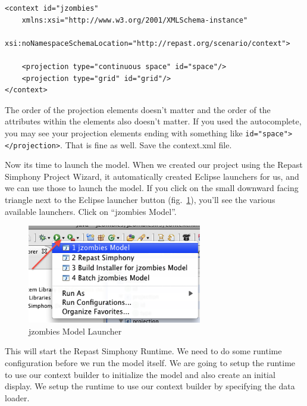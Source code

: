 \documentclass[11pt]{amsart}
\begin{document}
\noindent\begin{minipage}[h]{\textwidth}
\vspace{.2in}
\lstset{language=java,caption=context.xml Complete }
\begin{lstlisting}
<context id="jzombies"
	xmlns:xsi="http://www.w3.org/2001/XMLSchema-instance"
	xsi:noNamespaceSchemaLocation="http://repast.org/scenario/context">
	
	<projection type="continuous space" id="space"/>
	<projection type="grid" id="grid"/>
</context>

\end{lstlisting}
\vspace{.2in}
\end{minipage}
The order of the projection elements doesn't matter and the order of the attributes within the elements also doesn't matter. If you used the autocomplete, you   may see your projection elements ending with something like \texttt{id="space"></projection>}. That is fine as well. Save the context.xml file.

Now its time to launch the model. When we created our project using the Repast Simphony Project Wizard, it automatically created Eclipse launchers for us, and we can use those to launch the model. If you click on the small downward facing triangle next to the Eclipse launcher button (fig.~\ref{fig:launch}), you'll see the various available launchers. Click on ``jzombies Model''.

\begin{figure}[h]
\begin{center}
\vspace{.2in}
\centerline {
\includegraphics[width=3in]{GettingStartedImages/launcher.png}
}
\caption{jzombies Model Launcher}
\label{fig:launch}
\end{center}
\end{figure}

This will start the Repast Simphony Runtime. We need to do some runtime configuration before we run the model itself. We are going to setup the runtime to use our context builder to initialize the model and also create an initial display. We setup the runtime to use our context builder by specifying the data loader.
\end{document}
